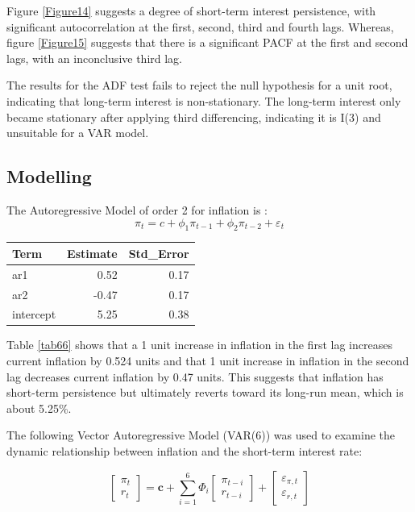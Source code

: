 \documentclass[11pt,preprint]{elsarticle}
\let\origtable\table
\let\endorigtable\endtable
\renewenvironment{table}[1][2] {
    \expandafter\origtable\expandafter[H]
} {
    \endorigtable
}
\numberwithin{equation}{section}
\numberwithin{figure}{section}
\numberwithin{table}{section}
\begin{document}
Figure \ref{Figure14} suggests a degree of short-term interest
persistence, with significant autocorrelation at the first, second,
third and fourth lags. Whereas, figure \ref{Figure15} suggests that
there is a significant PACF at the first and second lags, with an
inconclusive third lag.

The results for the ADF test fails to reject the null hypothesis for a
unit root, indicating that long-term interest is non-stationary. The
long-term interest only became stationary after applying third
differencing, indicating it is I(3) and unsuitable for a VAR model.

\bigskip

\subsection{Modelling}\label{modelling}

The Autoregressive Model of order 2 for inflation is : \begin{equation}
\pi_t = c + \phi_1 \pi_{t-1} + \phi_2 \pi_{t-2} + \varepsilon_t
\end{equation}

\begin{table}[H]
\centering
\begin{tabular}{lrr}
  \hline
Term & Estimate & Std\_Error \\ 
  \hline
ar1 & 0.52 & 0.17 \\ 
  ar2 & -0.47 & 0.17 \\ 
  intercept & 5.25 & 0.38 \\ 
   \hline
\end{tabular}
\caption{AR(2) Model Coefficients for Inflation \label{tab66}} 
\end{table}

Table \ref{tab66} shows that a 1 unit increase in inflation in the first
lag increases current inflation by 0.524 units and that 1 unit increase
in inflation in the second lag decreases current inflation by 0.47
units. This suggests that inflation has short-term persistence but
ultimately reverts toward its long-run mean, which is about 5.25\%.

\bigskip

The following Vector Autoregressive Model (VAR(6)) was used to examine
the dynamic relationship between inflation and the short-term interest
rate:

\begin{equation}
\begin{bmatrix}
\pi_t \\
r_t
\end{bmatrix}
=
\mathbf{c}
+
\sum_{i=1}^{6}
\Phi_i
\begin{bmatrix}
\pi_{t-i} \\
r_{t-i}
\end{bmatrix}
+
\begin{bmatrix}
\varepsilon_{\pi,t} \\
\varepsilon_{r,t}
\end{bmatrix}
\end{equation}
\end{document}
